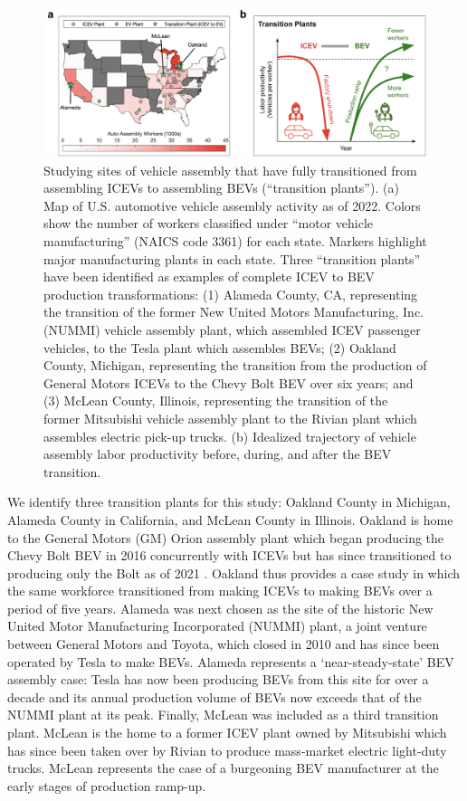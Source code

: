 \documentclass[sn-mathphys,Numbered]{sn-jnl}%
\begin{document}
\begin{figure}[tp!]
\centering
\includegraphics[width=1.0\linewidth]{figures/fig_assembly.png}
\caption{Studying sites of vehicle assembly that have fully transitioned from assembling ICEVs to assembling BEVs (``transition plants''). (a) Map of U.S. automotive vehicle assembly activity as of 2022. Colors show the number of workers classified under ``motor vehicle manufacturing'' (NAICS code 3361) for each state. Markers highlight major manufacturing plants in each state. Three ``transition plants'' have been identified as examples of complete ICEV to BEV production transformations: (1) Alameda County, CA, representing the transition of the former New United Motors Manufacturing, Inc. (NUMMI) vehicle assembly plant, which assembled ICEV passenger vehicles, to the Tesla plant which assembles BEVs; (2) Oakland County, Michigan, representing the transition from the production of General Motors ICEVs to the Chevy Bolt BEV over six years; and (3) McLean County, Illinois, representing the transition of the former Mitsubishi vehicle assembly plant to the Rivian plant which assembles electric pick-up trucks. (b) Idealized trajectory of vehicle assembly labor productivity before, during, and after the BEV transition.}
\label{fig:assembly}
\end{figure}

We identify three transition plants for this study: Oakland County in Michigan, Alameda County in California, and McLean County in Illinois. Oakland is home to the General Motors (GM) Orion assembly plant which began producing the Chevy Bolt BEV in 2016 concurrently with ICEVs but has since transitioned to producing only the Bolt as of 2021 \cite{Burden2016-pg}. Oakland thus provides a case study in which the same workforce transitioned from making ICEVs to making BEVs over a period of five years. Alameda was next chosen as the site of the historic New United Motor Manufacturing Incorporated (NUMMI) plant, a joint venture between General Motors and Toyota, which closed in 2010 and has since been operated by Tesla to make BEVs. Alameda represents a `near-steady-state' BEV assembly case: Tesla has now been producing BEVs from this site for over a decade and its annual production volume of BEVs now exceeds that of the NUMMI plant at its peak. Finally, McLean was included as a third transition plant. McLean is the home to a former ICEV plant owned by Mitsubishi which has since been taken over by Rivian to produce mass-market electric light-duty trucks. McLean represents the case of a burgeoning BEV manufacturer at the early stages of production ramp-up.
\end{document}
